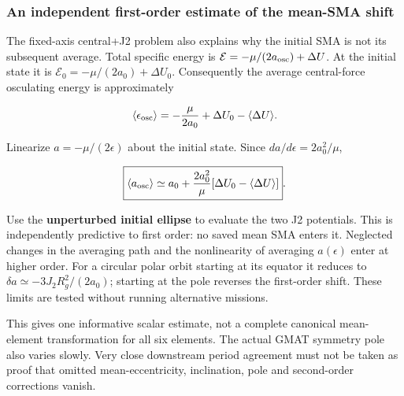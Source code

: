 \documentclass[10pt,a4paper]{article}
\numberwithin{equation}{section}
\begin{document}
\subsubsection*{An independent first-order estimate of the mean-SMA shift}

\begin{sloppypar}The fixed-axis central+J2 problem also explains why the initial SMA is not its subsequent average. Total specific energy is \(\mathcal E=-\mu/(2a_{\rm osc})+\Delta U\). At the initial state it is \(\mathcal E_0=-\mu/(2a_0)+\Delta U_0\). Consequently the average central-force osculating energy is approximately\end{sloppypar}


\begin{equation}\langle\epsilon_{\rm osc}\rangle
=-\frac{\mu}{2a_0}+\Delta U_0-\langle\Delta U\rangle.\label{eq:ch3-15}\end{equation}

\begin{sloppypar}Linearize \(a=-\mu/(2\epsilon)\) about the initial state. Since \(da/d\epsilon=2a_0^2/\mu\),\end{sloppypar}


\begin{equation}\boxed{\langle a_{\rm osc}\rangle\simeq
a_0+\frac{2a_0^2}{\mu}
[\Delta U_0-\langle\Delta U\rangle]}.\label{eq:ch3-16}\end{equation}

\begin{sloppypar}Use the \textbf{unperturbed initial ellipse} to evaluate the two J2 potentials. This is independently predictive to first order: no saved mean SMA enters it. Neglected changes in the averaging path and the nonlinearity of averaging \(a(\epsilon)\) enter at higher order. For a circular polar orbit starting at its equator it reduces to \(\delta a\simeq-3J_2R_g^2/(2a_0)\); starting at the pole reverses the first-order shift. These limits are tested without running alternative missions.\end{sloppypar}


\begin{sloppypar}This gives one informative scalar estimate, not a complete canonical mean-element transformation for all six elements. The actual GMAT symmetry pole also varies slowly. Very close downstream period agreement must not be taken as proof that omitted mean-eccentricity, inclination, pole and second-order corrections vanish.\end{sloppypar}
\end{document}
